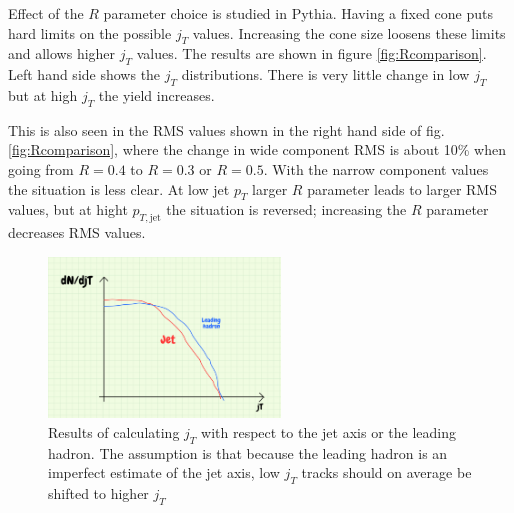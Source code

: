 Effect of the $R$ parameter choice is studied in Pythia. Having a fixed cone puts hard limits on the possible $j_T$ values. Increasing the cone size loosens these limits and allows higher $j_T$ values. The results are shown in figure \ref{fig:Rcomparison}. Left hand side shows the $j_T$ distributions. There is very little change in low $j_T$ but at high $j_T$ the yield increases. 

This is also seen in the RMS values shown in the right hand side of fig. \ref{fig:Rcomparison}, where the change in wide component RMS is about 10\% when going from $R=0.4$ to $R=0.3$ or $R=0.5$. With the narrow component values the situation is less clear. At low jet $p_T$ larger $R$ parameter leads to larger RMS values, but at hight $p_{T,\mathrm{jet}}$ the situation is reversed; increasing the $R$ parameter decreases RMS values.

\begin{figure}[htp]
\centering
\includegraphics[width=0.55\textwidth]{figures/PlaceHolder.png}
\caption{Results of calculating $j_T$ with respect to the jet axis or the leading hadron. The assumption is that because the leading hadron is an imperfect estimate of the jet axis, low $j_T$ tracks should on average be shifted to higher $j_T$}
\end{figure}


